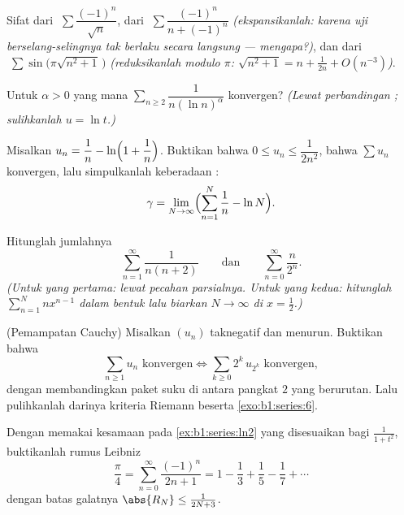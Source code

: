 \begin{exercise}[$\star\star$]\label{exo:b1:series:5}
Sifat dari $\;\sum \dfrac{(-1)^n}{\sqrt n}$, dari $\;\sum
\dfrac{(-1)^n}{n + (-1)^n}$ \emph{(ekspansikanlah: karena uji berselang-selingnya tak
berlaku secara langsung --- mengapa?)}, dan dari $\;\sum
\sin\bigl(\pi\sqrt{n^2+1}\,\bigr)$ \emph{(reduksikanlah modulo $\pi$:
$\sqrt{n^2+1} = n + \frac{1}{2n} + O(n^{-3})$)}.
\end{exercise}

\begin{exercise}[$\star\star$]\label{exo:b1:series:6}
Untuk $\alpha > 0$ yang mana $\sum_{n \geq 2}
\dfrac{1}{n (\ln n)^{\alpha}}$ konvergen? \emph{(Lewat perbandingan ;
sulihkanlah $u = \ln t$.)}
\end{exercise}

\begin{exercise}[$\star\star$]\label{exo:b1:series:7}
Misalkan $u_n = \dfrac{1}{n} - \ln\Bigl(1 + \dfrac1n\Bigr)$. Buktikan bahwa
$0 \leq u_n \leq \dfrac{1}{2n^2}$, bahwa $\sum u_n$ konvergen, lalu
simpulkanlah keberadaan :
\[
\gamma = \lim_{N \to \infty} \Bigl( \sum_{n=1}^{N} \frac 1n - \ln N
\Bigr) .
\]
\end{exercise}

\begin{exercise}[$\star\star$]\label{exo:b1:series:8}
Hitunglah jumlahnya
\[
\sum_{n=1}^{\infty} \frac{1}{n(n+2)}
\qquad\text{dan}\qquad
\sum_{n=0}^{\infty} \frac{n}{2^n} .
\]
\emph{(Untuk yang pertama: lewat pecahan parsialnya. Untuk yang kedua: hitunglah
$\sum_{n=1}^{N} n x^{n-1}$ dalam bentuk  lalu biarkan $N \to \infty$ di
$x = \frac12$.)}
\end{exercise}

\begin{exercise}[$\star\star\star$]\label{exo:b1:series:9}
(Pemampatan Cauchy) Misalkan $(u_n)$ taknegatif dan menurun.
Buktikan bahwa
\[
\sum_{n \geq 1} u_n \text{ konvergen}
\iff
\sum_{k \geq 0} 2^k\, u_{2^k} \text{ konvergen},
\]
dengan membandingkan paket suku di antara pangkat $2$ yang berurutan.
Lalu pulihkanlah darinya kriteria Riemann beserta
\cref{exo:b1:series:6}.
\end{exercise}

\begin{exercise}[$\star\star\star$]\label{exo:b1:series:10}
Dengan memakai kesamaan  pada \cref{ex:b1:series:ln2} yang disesuaikan bagi
$\frac{1}{1+t^2}$, buktikanlah rumus Leibniz
\[
\frac{\pi}{4} = \sum_{n=0}^{\infty} \frac{(-1)^n}{2n+1}
= 1 - \frac13 + \frac15 - \frac17 + \cdots
\]
dengan batas galatnya $\abs{R_N} \leq \frac{1}{2N+3}$.
\end{exercise}

